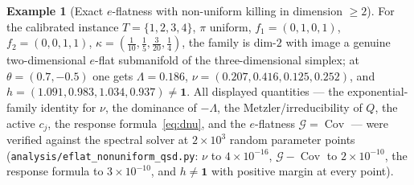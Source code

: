 \documentclass[11pt,reqno]{amsart}
\theoremstyle{plain}
\theoremstyle{definition}
\newtheorem{example}[theorem]{Example}
\theoremstyle{remark}
\newcommand{\one}{\mathbf{1}}
\begin{document}
\begin{example}[Exact $e$-flatness with non-uniform killing in dimension $\ge2$]
For the calibrated instance $T=\{1,2,3,4\}$, $\pi$ uniform, $f_1=(0,1,0,1)$, $f_2=(0,0,1,1)$,
$\kappa=(\tfrac1{10},\tfrac15,\tfrac3{20},\tfrac14)$, the family is dim-$2$ with image a
genuine two-dimensional $e$-flat submanifold of the three-dimensional simplex; at
$\theta=(0.7,-0.5)$ one gets $\Lambda=0.186$, $\nu=(0.207,0.416,0.125,0.252)$, and
$h=(1.091,0.983,1.034,0.937)\neq\one$. All displayed quantities --- the exponential-family
identity for $\nu$, the dominance of $-\Lambda$, the Metzler/irreducibility of $Q$, the active
$c_j$, the response formula~\eqref{eq:dnu}, and the $e$-flatness $\mathcal G=\operatorname{Cov}$
--- were verified against the spectral solver at $2\times10^{3}$ random parameter points
(\texttt{analysis/eflat\_nonuniform\_qsd.py}: $\nu$ to $4\times10^{-16}$,
$\mathcal G-\operatorname{Cov}$ to $2\times10^{-10}$, the response formula to $3\times10^{-10}$,
and $h\neq\one$ with positive margin at every point).
\end{example}
\end{document}
